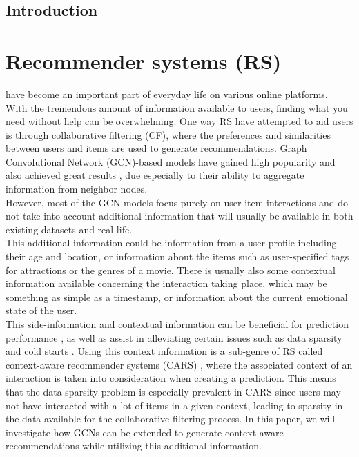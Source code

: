 \noindent
\section{Introduction}
\chapter{Recommender systems (RS)}\label{ch:introduction}
have become an important part of everyday life on various online platforms.
\\
With the tremendous amount of information available to users, finding what you need without help can be overwhelming.
One way RS have attempted to aid users is through collaborative filtering (CF), where the preferences and similarities between users and items are used to generate recommendations. 
Graph Convolutional Network (GCN)-based models have gained high popularity and also achieved great results \cite{NGCF,LightGCN,KGAT}, due especially to their ability to aggregate information from neighbor nodes.\\
However, most of the GCN models focus purely on user-item interactions and do not take into account additional information that will usually be available in both existing datasets and real life.
\\
This additional information could be information from a user profile including their age and location, or information about the items such as user-specified tags for attractions or the genres of a movie.
There is usually also some contextual information available concerning the interaction taking place, which may be something as simple as a timestamp, or information about the current emotional state of the user.\\
This side-information and contextual information can be beneficial for prediction performance \cite{ContextImportance2,ContextImportance3}, as well as assist in alleviating certain issues such as data sparsity and cold starts \cite{SideInfoDefinition}.
Using this context information is a sub-genre of RS called context-aware recommender systems (CARS) \cite{carsprogress}, where the associated context of an interaction is taken into consideration when creating a prediction.
This means that the data sparsity problem is especially prevalent in CARS since users may not have interacted with a lot of items in a given context, leading to sparsity in the data available for the collaborative filtering process.
In this paper, we will investigate how GCNs can be extended to generate context-aware recommendations while utilizing this additional information.
